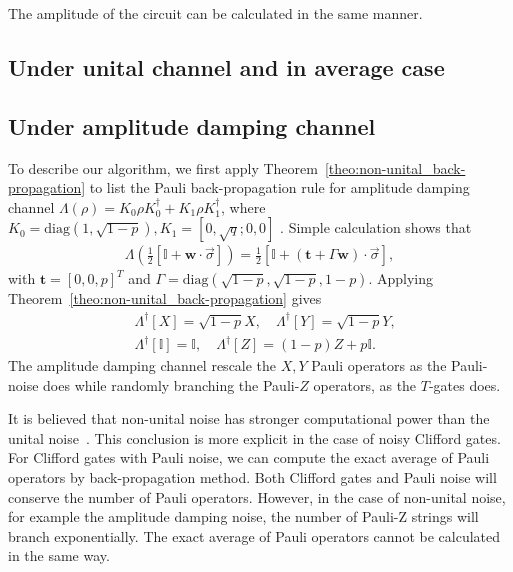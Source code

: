 \documentclass[aps,%
twocolumn,%
floatfix,%
pra,%
amsfonts,%
longbibliography,%
groupedaddress,%
superscriptaddress]{revtex4-2}%
\newcommand{\1}{\mathbbm{1}}
\begin{document}
The amplitude of the circuit can be calculated in the same manner. 
\subsection{Under unital channel and in average case}

\subsection{Under amplitude damping channel}

To describe our algorithm, we first apply Theorem~\ref{theo:non-unital_back-propagation} to list the Pauli back-propagation rule for amplitude damping channel
 $\Lambda(\rho) = K_0 \rho K_0^\dagger + K_1 \rho K_1^\dagger$, where $K_0 = \text{diag}(1, \sqrt{1 - p}), K_1 = [0,\sqrt{q}; 0,0]$ . Simple calculation shows that
  \begin{align}
    \Lambda\left(\frac{1}{2}[\mathbb{I} + \mathbf{w} \cdot \vec \sigma]\right) = \frac{1}{2}[\mathbb{I} + (\mathbf{t} + \Gamma\mathbf{w}) \cdot  \vec\sigma] ,
 \end{align}
 with $\mathbf{t}= [0,0,p]^T$ and $\Gamma = \text{diag}(\sqrt{1- p},\sqrt{1- p},1 - p)$. 
 Applying Theorem~\ref{theo:non-unital_back-propagation} gives
\begin{align}
   &\Lambda^\dagger[X] = \sqrt{1 - p} X,\quad  \Lambda^\dagger[Y] = \sqrt{1 - p} Y, \label{eq:Apd_supp} \\
   &\Lambda^\dagger[\mathbb{I}] = \mathbb{I},\quad  \Lambda^\dagger[Z] = (1 - p) Z + p\mathbb{I}.\label{eq:Apd_shift} 
\end{align}
The amplitude damping channel rescale the $X,Y$ Pauli operators as the Pauli-noise does while randomly branching the Pauli-$Z$ operators, as the $T$-gates does. 

It is believed that non-unital noise has stronger computational power than the unital noise~\cite{ben2013quantum}. This conclusion is more explicit in the case of noisy Clifford gates. For Clifford gates with Pauli noise, we can compute the exact average of Pauli operators by back-propagation method. Both Clifford gates and Pauli noise will conserve the number of Pauli operators.  However, in the case of non-unital noise, for example the amplitude damping noise, the number of Pauli-Z strings will branch exponentially. The exact average of Pauli operators cannot be calculated in the same way. 
\end{document}
